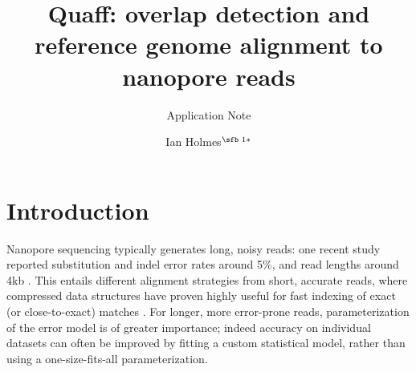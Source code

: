 \documentclass{bioinfo}
\begin{document}

\subtitle{Application Note}

\title[Quaff: alignment to nanopore reads]{Quaff: overlap detection and reference genome alignment to nanopore reads}
\author[Ian Holmes]{Ian Holmes$^{\text{\sfb 1}*}$}
\address{$^{\text{\sf 1}}$Department of Bioengineering, University of California, Berkeley, 94703, USA.}





\maketitle

\section{Introduction}

Nanopore sequencing typically generates long, noisy reads: one recent study reported substitution and indel error rates around 5\%, and read lengths around 4kb \citep{Jain2015-by}. This entails different alignment strategies from short, accurate reads, where compressed data structures have proven highly useful for fast indexing of exact (or close-to-exact) matches \citep{Lindner2012-tx}. For longer, more error-prone reads, parameterization of the error model is of greater importance; indeed accuracy on individual datasets can often be improved by fitting a custom statistical model, rather than using a one-size-fits-all parameterization.
\end{document}
